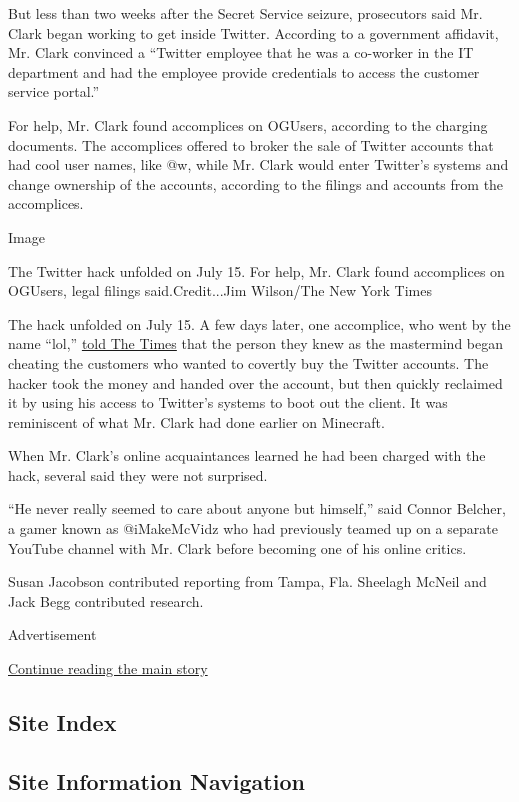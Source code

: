 But less than two weeks after the Secret Service seizure, prosecutors
said Mr. Clark began working to get inside Twitter. According to a
government affidavit, Mr. Clark convinced a ``Twitter employee that he
was a co-worker in the IT department and had the employee provide
credentials to access the customer service portal.''

For help, Mr. Clark found accomplices on OGUsers, according to the
charging documents. The accomplices offered to broker the sale of
Twitter accounts that had cool user names, like @w, while Mr. Clark
would enter Twitter's systems and change ownership of the accounts,
according to the filings and accounts from the accomplices.

Image

The Twitter hack unfolded on July 15. For help, Mr. Clark found
accomplices on OGUsers, legal filings said.Credit...Jim Wilson/The New
York Times

The hack unfolded on July 15. A few days later, one accomplice, who went
by the name ``lol,''
\href{https://www.nytimes.com/2020/07/17/technology/twitter-hackers-interview.html}{told
The Times} that the person they knew as the mastermind began cheating
the customers who wanted to covertly buy the Twitter accounts. The
hacker took the money and handed over the account, but then quickly
reclaimed it by using his access to Twitter's systems to boot out the
client. It was reminiscent of what Mr. Clark had done earlier on
Minecraft.

When Mr. Clark's online acquaintances learned he had been charged with
the hack, several said they were not surprised.

``He never really seemed to care about anyone but himself,'' said Connor
Belcher, a gamer known as @iMakeMcVidz who had previously teamed up on a
separate YouTube channel with Mr. Clark before becoming one of his
online critics.

Susan Jacobson contributed reporting from Tampa, Fla. Sheelagh McNeil
and Jack Begg contributed research.

Advertisement

\protect\hyperlink{after-bottom}{Continue reading the main story}

\hypertarget{site-index}{%
\subsection{Site Index}\label{site-index}}

\hypertarget{site-information-navigation}{%
\subsection{Site Information
Navigation}\label{site-information-navigation}}


